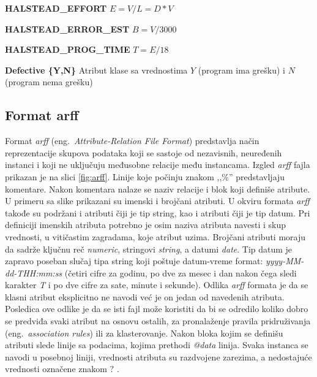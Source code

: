 \documentclass[12pt,oneside]{memoir}
\begin{document}
\textbf{HALSTEAD\_EFFORT} $E = V/L = D*V$

\textbf{HALSTEAD\_ERROR\_EST} $B = V/3000$

\textbf{HALSTEAD\_PROG\_TIME} $T = E/18$

\textbf{Defective \{Y,N\} } Atribut klase sa vrednostima $Y$ (program ima grešku) i $N$ (program nema grešku)

\subsection{Format arff}
Format \textit{arff} (eng.~\textit{Attribute-Relation File Format}) predstavlja način reprezentacije skupova podataka koji se sastoje od nezavisnih, neuređenih instanci i koji ne uključuju međusobne relacije među instancama. Izgled \textit{arff} fajla prikazan je na slici \ref{fig:arff}. Linije koje počinju znakom ,,\%'' predstavljaju komentare. Nakon komentara nalaze se naziv relacije i blok koji definiše atribute. U primeru sa slike prikazani su imenski i brojčani atributi. U okviru formata \textit{arff} takođe su podržani i atributi čiji je tip string, kao i atributi čiji je tip datum. Pri definiciji imenskih atributa potrebno je osim naziva atributa navesti i skup vrednosti, u vitičastim zagradama, koje atribut uzima. Brojčani atributi moraju da sadrže ključnu reč \textit{numeric}, stringovi \textit{string}, a datumi \textit{date}. Tip datum je zapravo poseban slučaj tipa string koji poštuje datum-vreme format: \textit{yyyy-MM-dd-THH:mm:ss} (četiri cifre za godinu, po dve za mesec i dan nakon čega sledi karakter \textit{T} i po dve cifre za sate, minute i sekunde). Odlika \textit{arff} formata je da se klasni atribut eksplicitno ne navodi već je on jedan od navedenih atributa. Posledica ove odlike je da se isti fajl može koristiti da bi se odredilo koliko dobro se predviđa svaki atribut na osnovu ostalih, za pronalaženje pravila pridruživanja (eng.~\textit{association rules}) ili za klasterovanje. Nakon bloka kojim se definišu atributi slede linije sa podacima, kojima prethodi \textit{@data} linija. Svaka instanca se navodi u posebnoj liniji, vrednosti atributa su razdvojene zarezima, a nedostajuće vrednosti označene znakom $?$ \cite{weka}. 
\end{document}

